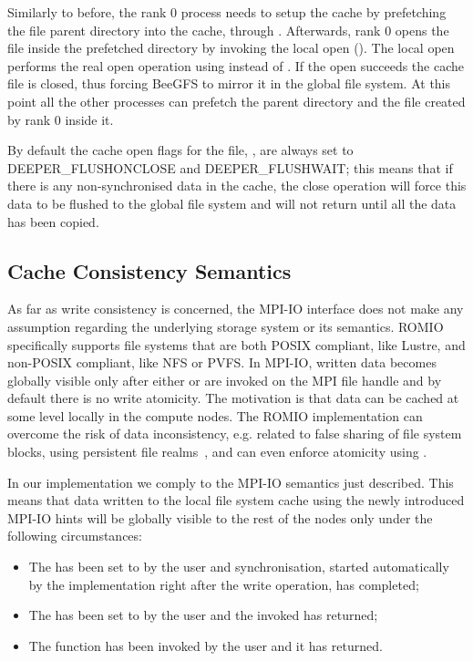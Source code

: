 Similarly to before, the rank 0 process needs to setup the cache by prefetching the file parent directory into the cache, through . Afterwards, rank 0 opens the file inside the prefetched directory by invoking the local open (). The local open performs the real open operation using  instead of . If the open succeeds the cache file is closed, thus forcing BeeGFS to mirror it in the global file system. At this point all the other processes can prefetch the parent directory and the file created by rank 0 inside it.

By default the cache open flags for the file, , are always set to DEEPER\_FLUSHONCLOSE and DEEPER\_FLUSHWAIT; this means that if there is any non-synchronised data in the cache, the close operation will force this data to be flushed to the global file system and will not return until all the data has been copied.

\subsection{Cache Consistency Semantics}
\label{subsec: consistency}
As far as write consistency is concerned, the MPI-IO interface does not make any assumption regarding the underlying storage system or its semantics. ROMIO specifically supports file systems that are both POSIX compliant, like Lustre, and non-POSIX compliant, like NFS or PVFS. In MPI-IO, written data becomes globally visible only after either  or  are invoked on the MPI file handle and by default there is no write atomicity. The motivation is that data can be cached at some level locally in the compute nodes. The ROMIO implementation can overcome the risk of data inconsistency, e.g. related to false sharing of file system blocks, using persistent file realms~\cite{ColomaCWWRP04}, and can even enforce atomicity using .

In our implementation we comply to the MPI-IO semantics just described. This means that data written to the local file system cache using the newly introduced MPI-IO hints will be globally visible to the rest of the nodes only under the following circumstances:
\begin{itemize}
\item The  has been set to  by the user and synchronisation, started automatically by the implementation right after the write operation, has completed;
\item The  has been set to  by the user and the invoked  has returned;
\item The  function has been invoked by the user and it has returned.
\end{itemize}

